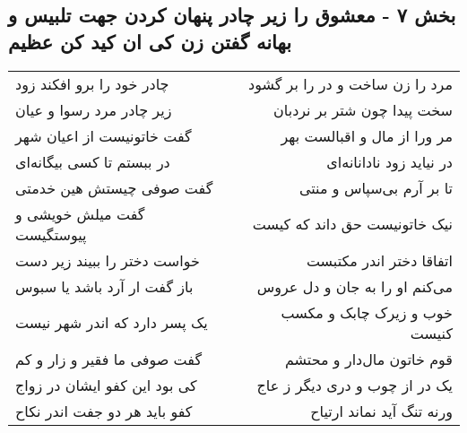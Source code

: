 \begin{center}
\section*{بخش ۷ - معشوق را زیر چادر پنهان کردن  جهت تلبیس و بهانه گفتن  زن کی ان کید کن عظیم}
\label{sec:sh007}
\begin{longtable}{l p{0.5cm} r}
چادر خود را برو افکند زود
&&
مرد را زن ساخت و در را بر گشود
\\
زیر چادر مرد رسوا و عیان
&&
سخت پیدا چون شتر بر نردبان
\\
گفت خاتونیست از اعیان شهر
&&
مر ورا از مال و اقبالست بهر
\\
در ببستم تا کسی بیگانه‌ای
&&
در نیاید زود نادانانه‌ای
\\
گفت صوفی چیستش هین خدمتی
&&
تا بر آرم بی‌سپاس و منتی
\\
گفت میلش خویشی و پیوستگیست
&&
نیک خاتونیست حق داند که کیست
\\
خواست دختر را ببیند زیر دست
&&
اتفاقا دختر اندر مکتبست
\\
باز گفت ار آرد باشد یا سبوس
&&
می‌کنم او را به جان و دل عروس
\\
یک پسر دارد که اندر شهر نیست
&&
خوب و زیرک چابک و مکسب کنیست
\\
گفت صوفی ما فقیر و زار و کم
&&
قوم خاتون مال‌دار و محتشم
\\
کی بود این کفو ایشان در زواج
&&
یک در از چوب و دری دیگر ز عاج
\\
کفو باید هر دو جفت اندر نکاح
&&
ورنه تنگ آید نماند ارتیاح
\\
\end{longtable}
\end{center}
